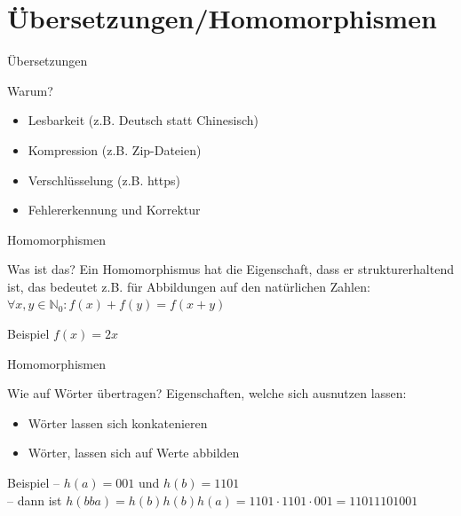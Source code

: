 	\section{Übersetzungen/Homomorphismen}
	\begin{frame}{Übersetzungen}
		\begin{block}{Warum?}
			\begin{itemize}
				\item Lesbarkeit (z.B. Deutsch statt Chinesisch)
				
				\pause
				\item Kompression (z.B. Zip-Dateien)
				
				\pause
				\item Verschlüsselung (z.B. https)
				
				\pause
				\item Fehlererkennung und Korrektur 
			\end{itemize}
		\end{block}
	\end{frame}
	
	
	\begin{frame}{Homomorphismen}
		\begin{block}{Was ist das?}
			Ein Homomorphismus hat die Eigenschaft, 
			dass er strukturerhaltend ist, 
			das bedeutet z.B. für Abbildungen auf den natürlichen Zahlen:\\
			\vspace{10pt}
			$\forall x,y \in \mathbb{N}_0 : f(x) + f(y) = f(x+y)$ 
		\end{block}
		
		\pause
		
		\begin{exampleblock}{Beispiel}
			$f(x) = 2x$
		\end{exampleblock}
	\end{frame}
	
	
	\begin{frame}{Homomorphismen}
		\begin{block}{Wie auf Wörter übertragen?}
			Eigenschaften, welche sich ausnutzen lassen:\\
			\begin{itemize}
				\item Wörter lassen sich konkatenieren
				
				\item Wörter, lassen sich auf Werte abbilden
			\end{itemize}
		\end{block}
		
		\pause		
		
		\begin{exampleblock}{Beispiel}
			-- $h(a) = 001$ und $h(b) = 1101$\\
			-- dann ist $h(bba) = h(b)h(b)h(a) = 1101 \cdot 1101 \cdot 001 = 11011101001$\\
			\vspace{10pt}
			\visible<3->{Warum?}
		\end{exampleblock}
	\end{frame}
	
